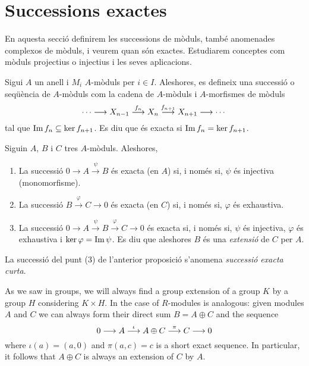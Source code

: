 \documentclass[../../../main.tex]{subfiles}
\begin{document}
\section{Successions exactes}


En aquesta secció definirem les successions de mòduls, també anomenades complexos de mòduls, i veurem quan són exactes. Estudiarem conceptes com mòduls projectius o injectius i les seves aplicacions.


\begin{defi}
 Sigui $A$ un anell i $M_i$ $A$-mòduls per $i\in I$. Aleshores, es defineix una successió o seqüència de $A$-mòduls com la cadena de $A$-mòduls i $A$-morfismes de mòduls
\begin{equation}
    \notag
    \cdots \longrightarrow X_{n-1}\overset{f_n}{\longrightarrow} X_n\overset{f_{n+1}}{\longrightarrow} X_{n+1}\longrightarrow\cdots
\end{equation}
tal que $\operatorname{Im} f_{n}\subseteq \ker f_{n+1}$. Es diu que és exacta si $\operatorname{Im} f_{n} =\ker f_{n+1}$.
\end{defi}

\begin{prop}
Siguin $A$, $B$ i $C$ tres $A$-mòduls. Aleshores,
\begin{enumerate}[(1)]
    \item La successió $0\to A\overset{\psi}{\to}B$ és exacta (en $A$) si, i només si, $\psi$ és injectiva (monomorfisme).
    \item La successió $B\overset{\varphi}{\to}C\to 0$ és exacta (en $C$) si, i només si, $\varphi$ és exhaustiva.
    \item La successió $0\to A\overset{\psi}{\to}B\overset{\varphi}{\to}C\to 0$ és exacta si, i només si, $\psi$ és injectiva, $\varphi$ és exhaustiva i $\ker\varphi = \operatorname{Im}\psi$. Es diu que aleshores $B$ és una \textit{extensió} de $C$ per $A$. 
\end{enumerate}
\end{prop}


\begin{defi}
\label{def:successioexactacurta} La successió del punt (3) de l'anterior proposició s'anomena \textit{successió exacta curta}.
\end{defi}

\begin{ej}
As we saw in groups, we will always find a group extension of a group $K$ by a group $H$ considering $K\times H$. In the case of $R$-modules is analogous: given modules $A$ and $C$ we can always form their direct sum $B = A\oplus C$ and the sequence
\begin{equation}
    \notag
    0\longrightarrow A\overset{\iota}{\longrightarrow} A\oplus C\overset{\pi}{\longrightarrow} C\longrightarrow 0
\end{equation}
where $\iota(a) = (a,0)$ and $\pi(a,c) = c$ is a short exact sequence. In particular, it follows that $A\oplus C$ is always an extension of $C$ by $A$.
\end{ej}
\end{document}

